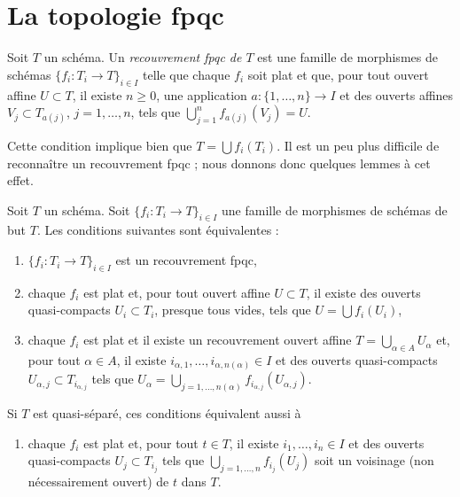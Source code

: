 \section{La topologie fpqc}
\label{section-fpqc}

\begin{definition}
\label{definition-fpqc-covering}
Soit $T$ un schéma. Un {\it recouvrement fpqc de $T$} est une famille
de morphismes de schémas $\{f_i : T_i \to T\}_{i \in I}$
telle que chaque $f_i$ soit plat et que, pour tout ouvert affine
$U \subset T$, il existe $n \geq 0$, une application
$a : \{1, \ldots, n\} \to I$ et des ouverts affines
$V_j \subset T_{a(j)}$, $j = 1, \ldots, n$,
tels que $\bigcup_{j = 1}^n f_{a(j)}(V_j) = U$.
\end{definition}

\noindent
Cette condition implique bien que $T = \bigcup f_i(T_i)$.
Il est un peu plus difficile de reconnaître un recouvrement fpqc ; nous donnons donc
quelques lemmes à cet effet.

\begin{lemma}
\label{lemma-recognize-fpqc-covering}
Soit $T$ un schéma. Soit $\{f_i : T_i \to T\}_{i \in I}$ une famille de
morphismes de schémas de but $T$. Les conditions suivantes sont équivalentes :
\begin{enumerate}
\item $\{f_i : T_i \to T\}_{i \in I}$ est un recouvrement fpqc,
\item chaque $f_i$ est plat et, pour tout ouvert affine $U \subset T$,
il existe des ouverts quasi-compacts
$U_i \subset T_i$, presque tous vides,
tels que $U = \bigcup f_i(U_i)$,
\item chaque $f_i$ est plat et il existe un recouvrement ouvert affine
$T = \bigcup_{\alpha \in A} U_\alpha$ et, pour tout $\alpha \in A$,
il existe $i_{\alpha, 1}, \ldots, i_{\alpha, n(\alpha)} \in I$
et des ouverts quasi-compacts $U_{\alpha, j} \subset T_{i_{\alpha, j}}$ tels que
$U_\alpha =
\bigcup_{j = 1, \ldots, n(\alpha)} f_{i_{\alpha, j}}(U_{\alpha, j})$.
\end{enumerate}
Si $T$ est quasi-séparé, ces conditions équivalent aussi à
\begin{enumerate}
\item[(4)] chaque $f_i$ est plat et, pour tout $t \in T$, il existe
$i_1, \ldots, i_n \in I$ et des ouverts quasi-compacts $U_j \subset T_{i_j}$
tels que $\bigcup_{j = 1, \ldots, n} f_{i_j}(U_j)$ soit un
voisinage (non nécessairement ouvert) de $t$ dans $T$.
\end{enumerate}
\end{lemma}

